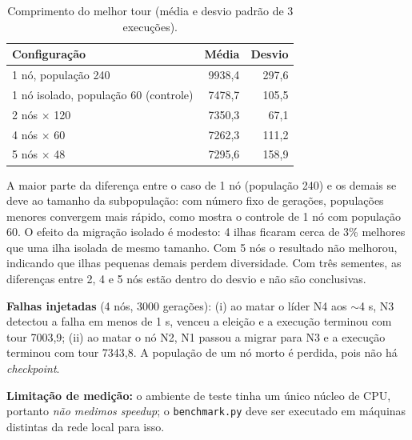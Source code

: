 \documentclass[12pt]{article}
\newcommand{\code}[1]{\texttt{\small #1}}
\begin{document}
\begin{table}[h]
\centering\small
\caption{Comprimento do melhor tour (média e desvio padrão de 3 execuções).}
\label{tab:res}
\begin{tabular}{@{}lrr@{}}
\toprule
Configuração & Média & Desvio \\ \midrule
1 nó, população 240 & 9938,4 & 297,6 \\
1 nó isolado, população 60 (controle) & 7478,7 & 105,5 \\
2 nós $\times$ 120 & 7350,3 & 67,1 \\
4 nós $\times$ 60 & 7262,3 & 111,2 \\
5 nós $\times$ 48 & 7295,6 & 158,9 \\ \bottomrule
\end{tabular}
\end{table}

A maior parte da diferença entre o caso de 1 nó (população 240) e os demais se deve ao tamanho da subpopulação: com número fixo de gerações, populações menores convergem mais rápido, como mostra o controle de 1 nó com população 60. O efeito da migração isolado é modesto: 4 ilhas ficaram cerca de 3\% melhores que uma ilha isolada de mesmo tamanho. Com 5 nós o resultado não melhorou, indicando que ilhas pequenas demais perdem diversidade. Com três sementes, as diferenças entre 2, 4 e 5 nós estão dentro do desvio e não são conclusivas.

\textbf{Falhas injetadas} (4 nós, 3000 gerações): (i) ao matar o líder N4 aos $\sim$4 s, N3 detectou a falha em menos de 1 s, venceu a eleição e a execução terminou com tour 7003,9; (ii) ao matar o nó N2, N1 passou a migrar para N3 e a execução terminou com tour 7343,8. A população de um nó morto é perdida, pois não há \textit{checkpoint}.

\textbf{Limitação de medição:} o ambiente de teste tinha um único núcleo de CPU, portanto \textit{não medimos \textit{speedup}}; o \code{benchmark.py} deve ser executado em máquinas distintas da rede local para isso.
\end{document}
